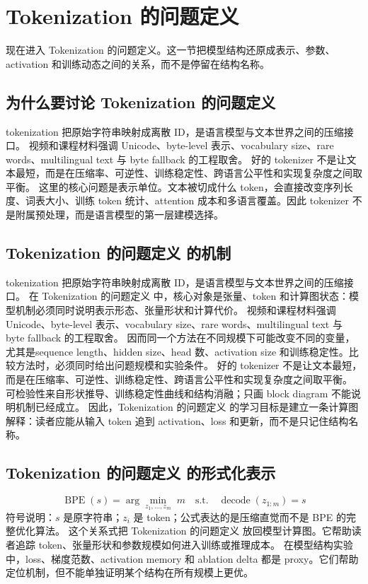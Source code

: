 \documentclass[a4paper]{article}
\begin{document}
\section{Tokenization 的问题定义}
现在进入 Tokenization 的问题定义。这一节把模型结构还原成表示、参数、activation 和训练动态之间的关系，而不是停留在结构名称。
\subsection{为什么要讨论 Tokenization 的问题定义}
tokenization 把原始字符串映射成离散 ID，是语言模型与文本世界之间的压缩接口。
视频和课程材料强调 Unicode、byte-level 表示、vocabulary size、rare words、multilingual text 与 byte fallback 的工程取舍。
好的 tokenizer 不是让文本最短，而是在压缩率、可逆性、训练稳定性、跨语言公平性和实现复杂度之间取平衡。
这里的核心问题是表示单位。文本被切成什么 token，会直接改变序列长度、词表大小、训练 token 统计、attention 成本和多语言覆盖。因此 tokenizer 不是附属预处理，而是语言模型的第一层建模选择。
\subsection{Tokenization 的问题定义 的机制}
tokenization 把原始字符串映射成离散 ID，是语言模型与文本世界之间的压缩接口。 在 Tokenization 的问题定义 中，核心对象是张量、token 和计算图状态：模型机制必须同时说明表示形态、张量形状和计算代价。
视频和课程材料强调 Unicode、byte-level 表示、vocabulary size、rare words、multilingual text 与 byte fallback 的工程取舍。 因而同一个方法在不同规模下可能改变不同的变量，尤其是sequence length、hidden size、head 数、activation size 和训练稳定性。比较方法时，必须同时给出问题规模和实验条件。
好的 tokenizer 不是让文本最短，而是在压缩率、可逆性、训练稳定性、跨语言公平性和实现复杂度之间取平衡。 可检验性来自形状推导、训练稳定性曲线和结构消融；只画 block diagram 不能说明机制已经成立。
因此，Tokenization 的问题定义 的学习目标是建立一条计算图解释：读者应能从输入 token 追到 activation、loss 和更新，而不是只记住结构名称。
\subsection{Tokenization 的问题定义 的形式化表示}
\[\operatorname{BPE}(s)=\arg\min_{z_1,\ldots,z_m}\;m\quad\text{s.t.}\quad \operatorname{decode}(z_{1:m})=s\]
符号说明：\(s\) 是原字符串；\(z_i\) 是 token；公式表达的是压缩直觉而不是 BPE 的完整优化算法。
这个关系式把 Tokenization 的问题定义 放回模型计算图。它帮助读者追踪 token、张量形状和参数规模如何进入训练或推理成本。
在模型结构实验中，loss、梯度范数、activation memory 和 ablation delta 都是 proxy。它们帮助定位机制，但不能单独证明某个结构在所有规模上更优。
\end{document}

